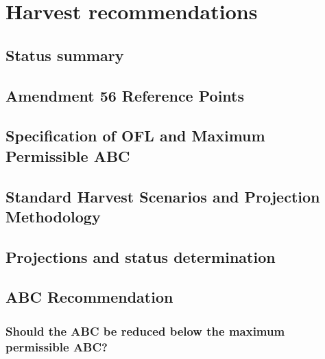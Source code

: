 \documentclass[11pt,]{article}
\begin{document}
\hypertarget{harvest-recommendations}{%
\section{Harvest recommendations}\label{harvest-recommendations}}

\hypertarget{status-summary}{%
\subsection{Status summary}\label{status-summary}}

\hypertarget{amendment-56-reference-points}{%
\subsection{Amendment 56 Reference
Points}\label{amendment-56-reference-points}}

\hypertarget{specification-of-ofl-and-maximum-permissible-abc}{%
\subsection{Specification of OFL and Maximum Permissible
ABC}\label{specification-of-ofl-and-maximum-permissible-abc}}

\hypertarget{standard-harvest-scenarios-and-projection-methodology}{%
\subsection{Standard Harvest Scenarios and Projection
Methodology}\label{standard-harvest-scenarios-and-projection-methodology}}

\hypertarget{projections-and-status-determination}{%
\subsection{Projections and status
determination}\label{projections-and-status-determination}}

\hypertarget{abc-recommendation}{%
\subsection{ABC Recommendation}\label{abc-recommendation}}

\hypertarget{should-the-abc-be-reduced-below-the-maximum-permissible-abc}{%
\subsubsection{Should the ABC be reduced below the maximum permissible
ABC?}\label{should-the-abc-be-reduced-below-the-maximum-permissible-abc}}
\end{document}
